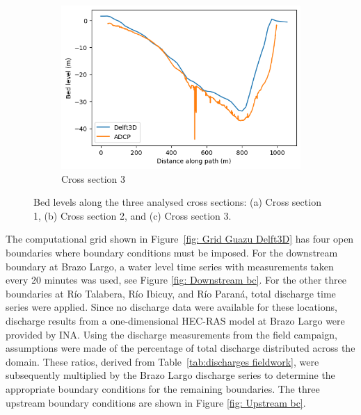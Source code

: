 \begin{figure}[H]
    \vspace{1em}
    \begin{subfigure}[t]{0.48\linewidth}
        \centering
        \includegraphics[width=\linewidth,height=0.7\linewidth,keepaspectratio]{figures/ch7/Bathymetry_cs3.png}
        \caption{Cross section 3}
        \label{fig:bathy_cs3}
    \end{subfigure}

    \caption{Bed levels along the three analysed cross sections: (a) Cross section 1, (b) Cross section 2, and (c) Cross section 3.}
    \label{fig:bathymetry_cross_sections}
\end{figure}

The computational grid shown in Figure~\ref{fig: Grid Guazu Delft3D} has four open boundaries where boundary conditions must be imposed. For the downstream boundary at Brazo Largo, a water level time series with measurements taken every 20 minutes was used, see Figure \ref{fig: Downstream bc}. For the other three boundaries at Río Talabera, Río Ibicuy, and Río Paraná, total discharge time series were applied. Since no discharge data were available for these locations, discharge results from a one-dimensional HEC-RAS model at Brazo Largo were provided by INA. Using the discharge measurements from the field campaign, assumptions were made of the percentage of total discharge distributed across the domain. These ratios, derived from Table~\ref{tab:discharges fieldwork}, were subsequently multiplied by the Brazo Largo discharge series to determine the appropriate boundary conditions for the remaining boundaries. The three upstream boundary conditions are shown in Figure \ref{fig: Upstream bc}.


